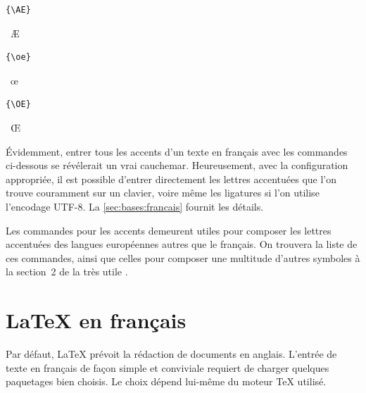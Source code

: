 \begin{demo}
  \begin{minipage}{0.2\linewidth}
    \begin{texample}
\begin{lstlisting}
{\AE}
\end{lstlisting}
      \producing\ \AE
    \end{texample}
  \end{minipage}
  \hfill
  \begin{minipage}{0.2\linewidth}
    \begin{texample}
\begin{lstlisting}
{\oe}
\end{lstlisting}
      \producing\ \oe
    \end{texample}
  \end{minipage}
  \hfill
  \begin{minipage}{0.2\linewidth}
    \begin{texample}
\begin{lstlisting}
{\OE}
\end{lstlisting}
      \producing\ \OE
    \end{texample}
  \end{minipage}
\end{demo}

Évidemment, entrer tous les accents d'un texte en français avec les
commandes ci-dessous se révélerait un vrai cauchemar. Heureusement,
avec la configuration appropriée, il est possible d'entrer directement
les lettres accentuées que l'on trouve couramment sur un clavier,
voire même les ligatures si l'on utilise l'encodage UTF-8. La
\autoref{sec:bases:francais} fournit les détails.

Les commandes pour les accents demeurent utiles pour composer les
lettres accentuées des langues européennes autres que le français. On
trouvera la liste de ces commandes, ainsi que celles pour composer une
multitude d'autres symboles à la section~2 de la très utile %
\citep{comprehensive}.


\section{{\LaTeX} en français}
\label{sec:bases:francais}

Par défaut, LaTeX prévoit la rédaction de documents en anglais.
L'entrée de texte en français de façon simple et conviviale requiert
de charger quelques paquetages bien choisis. Le choix dépend lui-même
du moteur {\TeX} utilisé.

